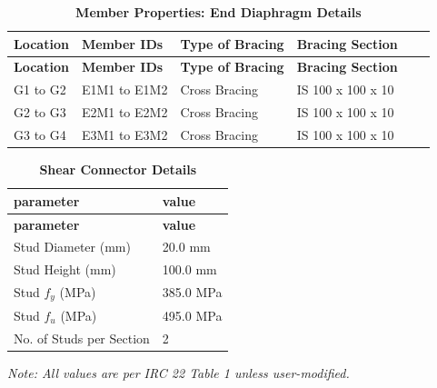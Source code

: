 \documentclass[12pt,a4paper]{report}
\numberwithin{table}{chapter}
\numberwithin{figure}{chapter}
\begin{document}
\vspace{0.4em}
\noindent
\setlength{\tabcolsep}{4pt}
\setlength\LTleft{0pt}
\setlength\LTright{\fill}

\begin{longtable}{|L{2.2cm}|L{2.2cm}|L{3.0cm}|L{2.5cm}|C{1.8cm}|C{1.8cm}|}
\caption{\textbf{Member Properties: End Diaphragm Details}}
\hline
{} \textbf{Location} & \textbf{Member IDs} & \textbf{Type of Bracing} & \textbf{Bracing Section} \\
\hline
\endfirsthead
\hline
{} \textbf{Location} & \textbf{Member IDs} & \textbf{Type of Bracing} & \textbf{Bracing Section} \\
\hline
\endhead
G1 to G2 & E1M1 to E1M2 & Cross Bracing & IS 100 x 100 x 10 \\[6pt]
\hline
G2 to G3 & E2M1 to E2M2 & Cross Bracing & IS 100 x 100 x 10 \\[6pt]
\hline
G3 to G4 & E3M1 to E3M2 & Cross Bracing & IS 100 x 100 x 10 \\[6pt]
\hline
\end{longtable}



\label{subsec:shear-connectors}

\vspace{2.2em}

\vspace{0.4em}
\begin{longtable}{|L{5.5cm}|p{10.0cm}|}
\caption{\textbf{Shear Connector Details}}
\hline
{} \textbf{parameter} & \textbf{value} \\
\hline
\endfirsthead
\hline
{} \textbf{parameter} & \textbf{value} \\
\hline
\endhead
\textnormal{Stud Diameter (mm)} & 20.0 mm \\[6pt]
\hline
\textnormal{Stud Height (mm)} & 100.0 mm \\[6pt]
\hline
\textnormal{Stud $f_y$ (MPa)} & 385.0 MPa \\[6pt]
\hline
\textnormal{Stud $f_u$ (MPa)} & 495.0 MPa \\[6pt]
\hline
\textnormal{No. of Studs per Section} & 2 \\[6pt]
\hline
\end{longtable}



\label{subsec:safety-factors}

\vspace{2.2em}

\vspace{0.3em}
\noindent\textit{Note: All values are per IRC 22 Table 1 unless user-modified.}
\end{document}
